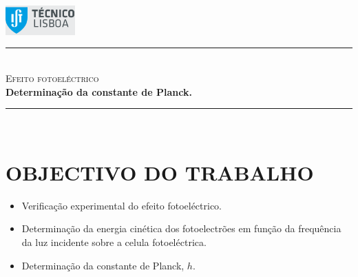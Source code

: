 \documentclass[a4paper,12pt]{article}  %
\author{Prof. Bernardo B. Carvalho}
\date{ Setembro  2015}
\newcommand{\HRule}{\rule{\linewidth}{0.5mm}}
\begin{document}
 

	\includegraphics[width=0.2\textwidth]{../logo-ist}%

	\HRule \\[0.5cm]
	{ \huge \sf  \textsc{Efeito fotoeléctrico}} \\[0.4cm] %
	{ \large \bfseries Determinação da constante de Planck.}\\
	\HRule \\%

\section{\sf OBJECTIVO DO TRABALHO}
\begin{itemize}
\item Verificação experimental do efeito fotoeléctrico.
\item Determinação da energia cinética dos fotoelectrões em função da frequência da luz incidente sobre a celula fotoeléctrica.
\item  Determinação da constante de Planck, $h$.
\end{itemize}
\end{document}
